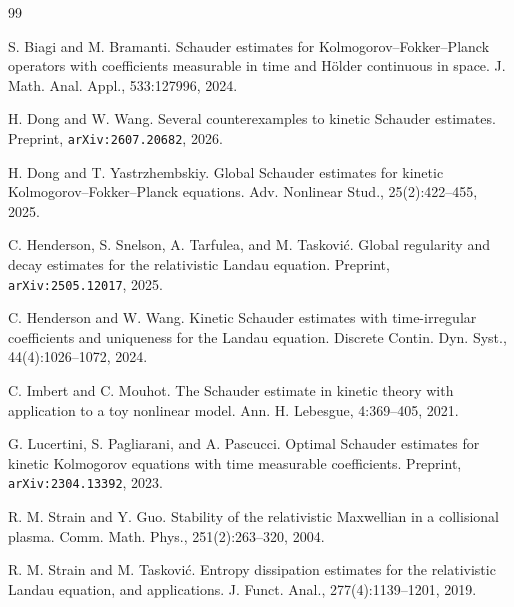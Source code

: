 \documentclass[11pt,reqno]{amsart}
\numberwithin{equation}{section}
\theoremstyle{remark}
\begin{document}
\begin{thebibliography}{99}

S. Biagi and M. Bramanti.
\newblock Schauder estimates for Kolmogorov--Fokker--Planck operators with coefficients measurable in time and H\"older continuous in space.
\newblock J. Math. Anal. Appl., 533:127996, 2024.

H. Dong and W. Wang.
\newblock Several counterexamples to kinetic Schauder estimates.
\newblock Preprint, \texttt{arXiv:2607.20682}, 2026.

H. Dong and T. Yastrzhembskiy.
\newblock Global Schauder estimates for kinetic Kolmogorov--Fokker--Planck equations.
\newblock Adv. Nonlinear Stud., 25(2):422--455, 2025.

C. Henderson, S. Snelson, A. Tarfulea, and M. Taskovi\'c.
\newblock Global regularity and decay estimates for the relativistic Landau equation.
\newblock Preprint, \texttt{arXiv:2505.12017}, 2025.

C. Henderson and W. Wang.
\newblock Kinetic Schauder estimates with time-irregular coefficients and uniqueness for the Landau equation.
\newblock Discrete Contin. Dyn. Syst., 44(4):1026--1072, 2024.

C. Imbert and C. Mouhot.
\newblock The Schauder estimate in kinetic theory with application to a toy nonlinear model.
\newblock Ann. H. Lebesgue, 4:369--405, 2021.

G. Lucertini, S. Pagliarani, and A. Pascucci.
\newblock Optimal Schauder estimates for kinetic Kolmogorov equations with time measurable coefficients.
\newblock Preprint, \texttt{arXiv:2304.13392}, 2023.

R. M. Strain and Y. Guo.
\newblock Stability of the relativistic Maxwellian in a collisional plasma.
\newblock Comm. Math. Phys., 251(2):263--320, 2004.

R. M. Strain and M. Taskovi\'c.
\newblock Entropy dissipation estimates for the relativistic Landau equation, and applications.
\newblock J. Funct. Anal., 277(4):1139--1201, 2019.

\end{thebibliography}
\end{document}
